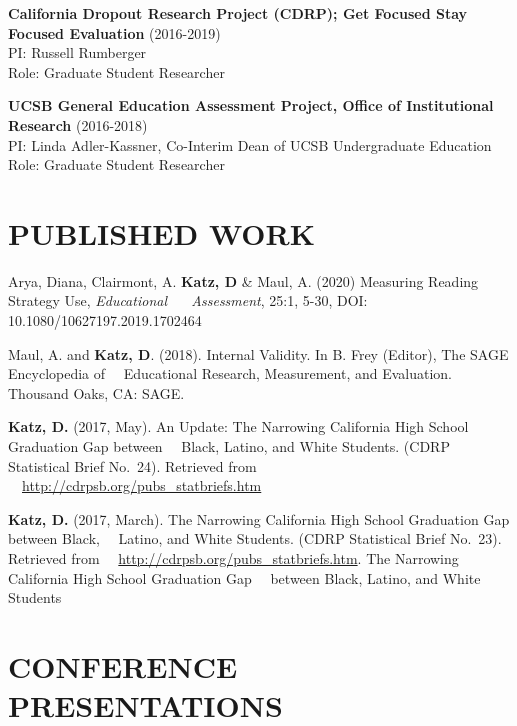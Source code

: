 \documentclass[11pt,]{article}
\begin{document}
\textbf{California Dropout Research Project (CDRP); Get Focused Stay
Focused Evaluation} (2016-2019)\\
\hspace*{0.333em}\hspace*{0.333em} PI: Russell Rumberger\\
\hspace*{0.333em}\hspace*{0.333em} Role: Graduate Student Researcher

\textbf{UCSB General Education Assessment Project, Office of
Institutional Research} (2016-2018)\\
\hspace*{0.333em}\hspace*{0.333em} PI: Linda Adler-Kassner, Co-Interim
Dean of UCSB Undergraduate Education\\
\hspace*{0.333em}\hspace*{0.333em} Role: Graduate Student Researcher

\hypertarget{published-work}{%
\section{PUBLISHED WORK}\label{published-work}}

Arya, Diana, Clairmont, A. \textbf{Katz, D} \& Maul, A. (2020) Measuring
Reading Strategy Use, \emph{Educational ~~ Assessment}, 25:1, 5-30, DOI:
10.1080/10627197.2019.1702464

Maul, A. and \textbf{Katz, D}. (2018). Internal Validity. In B. Frey
(Editor), The SAGE Encyclopedia of ~~Educational Research, Measurement,
and Evaluation. Thousand Oaks, CA: SAGE.

\textbf{Katz, D.} (2017, May). An Update: The Narrowing California High
School Graduation Gap between ~~Black, Latino, and White Students. (CDRP
Statistical Brief No.~24). Retrieved from
~~\url{http://cdrpsb.org/pubs_statbriefs.htm}

\textbf{Katz, D.} (2017, March). The Narrowing California High School
Graduation Gap between Black, ~~Latino, and White Students. (CDRP
Statistical Brief No.~23). Retrieved from
~~\url{http://cdrpsb.org/pubs_statbriefs.htm}. The Narrowing California
High School Graduation Gap ~~between Black, Latino, and White Students

\hypertarget{conference-presentations}{%
\section{CONFERENCE PRESENTATIONS}\label{conference-presentations}}
\end{document}
